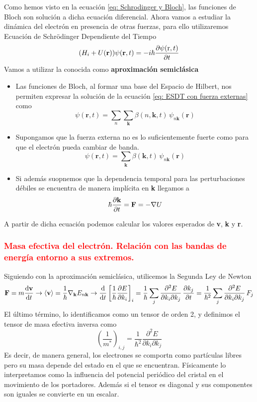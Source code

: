 Como hemos visto en la ecuación \ref{eq: Schrodinger y Bloch}, las funciones de Bloch son solución a dicha ecuación diferencial. Ahora vamos a estudiar la dinámica del electrón en presencia de otras fuerzas, para ello utilizaremos Ecuación de Schrödinger Dependiente del Tiempo
\begin{equation}
    (H_i+U(\mathbf{r}))\psi(\mathbf{r},t)=-i\hbar \pdiff[]{\psi(\mathrm{r},t)}{t}
    \label{eq: ESDT con fuerza externas}
\end{equation}
Vamos a utilizar la conocida como \textbf{aproximación semiclásica}
\begin{itemize}
    \item Las funciones de Bloch, al formar una base del Espacio de Hilbert, nos permiten expresar la solución de la ecuación \ref{eq: ESDT con fuerza externas} como $$\psi(\mathbf{r},t)=\sum_n \sum_\mathbf{k} \beta (n,\mathbf{k},t) \, \psi_{n\mathbf{k}} (\mathbf{r}) $$
    \item Supongamos que la fuerza externa no es lo suficientemente fuerte como para que el electrón pueda cambiar de banda.
    $$\psi(\mathbf{r},t)=\sum_\mathbf{k} \beta (\mathbf{k},t) \, \psi_{n\mathbf{k}} (\mathbf{r}) $$
    \item Si además suopnemos que la dependencia temporal para las perturbaciones débiles se encuentra de manera implícita en \textbf{k} llegamos a $$\hbar \pdiff[]{\mathbf{k}}{t}=\mathbf{F}=-\nabla U$$
\end{itemize}

A partir de dicha ecuación podemos calcular los valores esperados de \textbf{v}, \textbf{k} y \textbf{r}.
\subsubsection{\textcolor{red}{Masa efectiva del electrón. Relación con las bandas de energía entorno a sus extremos.}} \label{sec: Masa efectiva}
Siguiendo con la aproximación semiclásica, utilicemos la Segunda Ley de Newton
\begin{equation}
    \mathbf{F}=m \diff[]{\mathbf{v}}{t} \rightarrow \langle \mathbf{v}\rangle=\frac{1}{\hbar} \nabla_\mathbf{k} E_{n \mathbf{k}} \rightarrow{}\diff[]{}{t} \left[\frac{1}{\hbar}  \pdiff[]{E}{k_i} \right]_i=\frac{1}{\hbar} \sum_j \frac{\partial ^2 E}{\partial k_i \partial k_j} \, \frac{\partial k_j}{\partial t}=\frac{1}{\hbar^2} \sum_j \frac{\partial ^2 E}{\partial k_i \partial k_j} \, F_j
\end{equation}
El último término, lo identificamos como un tensor de orden 2, y definimos el tensor de masa efectiva inversa como
\begin{equation}
    \left(\frac{1}{m^*}\right)_{i,j}=\frac{1}{\hbar^2} \frac{\partial ^2 E}{\partial k_i \partial k_j} 
    \label{eq: masa efectiva}
\end{equation}
Es decir, de manera general, los electrones se comportn como partículas libres pero su masa depende del estado en el que se encuentran. Físicamente lo interpretamos como la influencia del potencial periódico del cristal en el movimiento de los portadores.
Además si el tensor es diagonal y sus componentes son iguales se convierte en un escalar.\\

